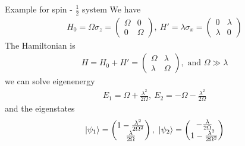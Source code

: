 \documentclass[UTF8,12pt]{article} %
\begin{document}
\begin{myboxes}{Example for spin - $\frac{1}{2}$ system}{}
We have
\begin{align}
H_{0} = \Omega \sigma_{z} = \begin{pmatrix}\Omega &0 \\ 0 &\Omega\end{pmatrix},~
H' = \lambda\sigma_{x} = \begin{pmatrix}0 &\lambda \\ \lambda &0\end{pmatrix}
\end{align}
The Hamiltonian is
\begin{align}
H = H_{0} + H' = \begin{pmatrix}\Omega &\lambda \\ \lambda & \Omega\end{pmatrix}, \text{ and } \Omega \gg \lambda
\end{align}
we can solve eigenenergy 
\begin{align}
E_{1} = \Omega + \frac{\lambda^2}{2\Omega},~ E_{2} = -\Omega - \frac{\lambda^2}{2\Omega}
\end{align}
and the eigenstates
\begin{align}
\ket{\psi_{1}} = \begin{pmatrix}1 - \frac{\lambda^2}{2\Omega^2} \\ \frac{\lambda}{2\Omega}\end{pmatrix},~
\ket{\psi_{2}} = \begin{pmatrix}-\frac{\lambda}{2\Omega} \\ 1-\frac{\lambda^2}{2\Omega^2}\end{pmatrix}
\end{align}
\end{myboxes}
\end{document}
